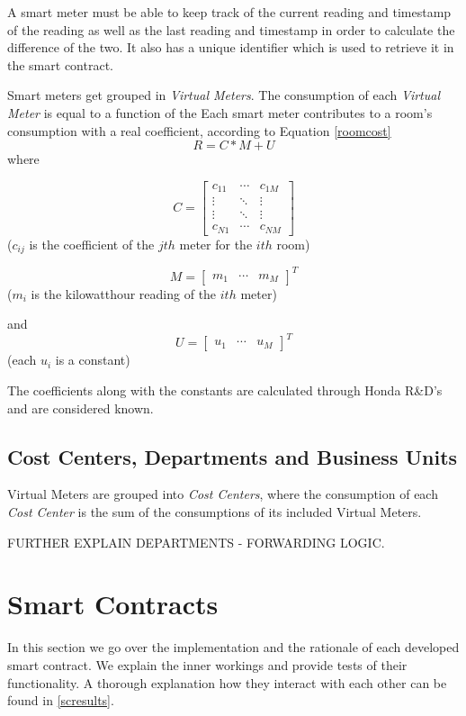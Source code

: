 A smart meter must be able to keep track of the current reading and timestamp of the reading as well as the last reading and timestamp in order to calculate the difference of the two. It also has a unique identifier which is used to retrieve it in the smart contract.

Smart meters get grouped in \textit{Virtual Meters}. The consumption of each \textit{Virtual Meter} is equal to a function of the Each smart meter contributes to a room's consumption with a real coefficient, according to Equation \ref{roomcost}
\begin{equation}\label{roomcost}
R = C * M + U
\end{equation}
\noindent where
\begin{description}
\item  \[C = 
\begin{bmatrix}
    c_{11} & \cdots & c_{1M} \\
    \vdots & \ddots & \vdots \\ 
    \vdots & \ddots & \vdots \\
    c_{N1} & \cdots & c_{NM}
  \end{bmatrix}\] ($c_{ij}$ is the coefficient of the $jth$ meter for the $ith$ room)
\item  \[M = 
\begin{bmatrix}
    m_{1} & \cdots & m_{M}
\end{bmatrix}^T\] ($m_{i}$ is the kilowatthour reading of the $ith$ meter)
\item  and \[U=
\begin{bmatrix}
    u_{1} & \cdots & u_{M}
\end{bmatrix}^T\] (each $u_{i}$ is a constant)
\end{description}

The coefficients along with the constants are calculated through Honda R\&D's and are considered known. 

\subsection{Cost Centers, Departments and Business Units}
Virtual Meters are grouped into \textit{Cost Centers}, where the consumption of each \textit{Cost Center} is the sum of the consumptions of its included Virtual Meters.

FURTHER EXPLAIN DEPARTMENTS - FORWARDING LOGIC.

\section{Smart Contracts} \label{ch:implementation:sc}
In this section we go over the implementation and the rationale of each developed smart contract. We explain the inner workings and provide tests of their functionality. A thorough explanation how they interact with each other can be found in \ref{scresults}.

